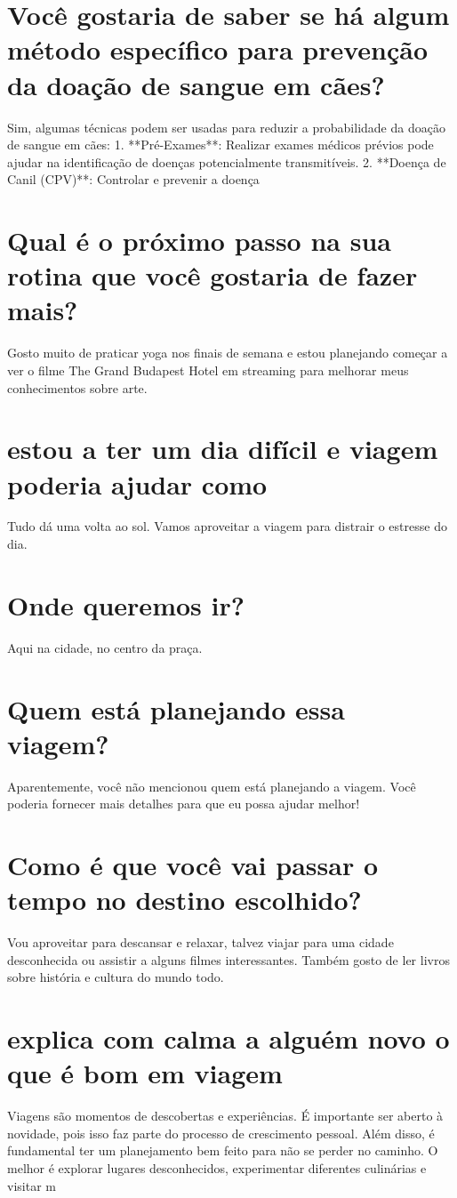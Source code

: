 \documentclass[11pt,a4paper]{article}
\begin{document}
\section{Você gostaria de saber se há algum método específico para prevenção da doação de sangue em cães?}
Sim, algumas técnicas podem ser usadas para reduzir a probabilidade da doação de sangue em cães: 1. **Pré-Exames**: Realizar exames médicos prévios pode ajudar na identificação de doenças potencialmente transmitíveis. 2. **Doença de Canil (CPV)**: Controlar e prevenir a doença

\section{Qual é o próximo passo na sua rotina que você gostaria de fazer mais?}
Gosto muito de praticar yoga nos finais de semana e estou planejando começar a ver o filme The Grand Budapest Hotel em streaming para melhorar meus conhecimentos sobre arte.

\section{estou a ter um dia difícil e viagem poderia ajudar como}
Tudo dá uma volta ao sol. Vamos aproveitar a viagem para distrair o estresse do dia.

\section{Onde queremos ir?}
Aqui na cidade, no centro da praça.

\section{Quem está planejando essa viagem?}
Aparentemente, você não mencionou quem está planejando a viagem. Você poderia fornecer mais detalhes para que eu possa ajudar melhor!

\section{Como é que você vai passar o tempo no destino escolhido?}
Vou aproveitar para descansar e relaxar, talvez viajar para uma cidade desconhecida ou assistir a alguns filmes interessantes. Também gosto de ler livros sobre história e cultura do mundo todo.

\section{explica com calma a alguém novo o que é bom em viagem}
Viagens são momentos de descobertas e experiências. É importante ser aberto à novidade, pois isso faz parte do processo de crescimento pessoal. Além disso, é fundamental ter um planejamento bem feito para não se perder no caminho. O melhor é explorar lugares desconhecidos, experimentar diferentes culinárias e visitar m
\end{document}

